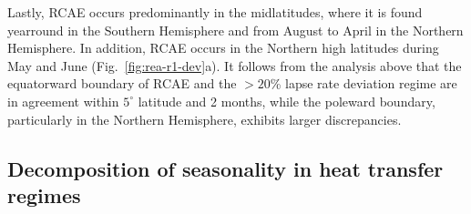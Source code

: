 \documentclass{ametsocV5}
\begin{document}
    Lastly, RCAE occurs predominantly in the midlatitudes, where it is found yearround in the Southern Hemisphere and from August to April in the Northern Hemisphere. In addition, RCAE occurs in the Northern high latitudes during May and June (Fig.~\ref{fig:rea-r1-dev}a). It follows from the analysis above that the equatorward boundary of RCAE and the $>20$\% lapse rate deviation regime are in agreement within $5^\circ$ latitude and 2 months, while the poleward boundary, particularly in the Northern Hemisphere, exhibits larger discrepancies. %


    \subsection{Decomposition of seasonality in heat transfer regimes}
\end{document}
